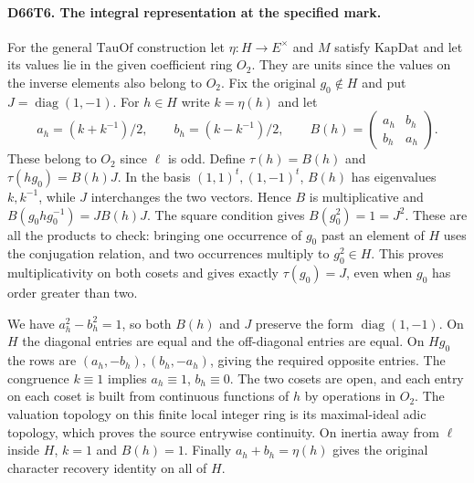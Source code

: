 \paragraph{D66T6. The integral representation at the specified mark.}
For the general $\mathrm{TauOf}$ construction let $\eta:H\to E^\times$
and $M$ satisfy $\mathrm{KapDat}$ and let its values lie in the
given coefficient ring $O_2$. They are units since the values on
the inverse elements also belong to $O_2$. Fix the original
$g_0\notin H$ and put $J=\operatorname{diag}(1,-1)$. For $h\in H$
write $k=\eta(h)$ and let
\[
 a_h=(k+k^{-1})/2,\qquad b_h=(k-k^{-1})/2,\qquad
 B(h)=\begin{pmatrix}a_h&b_h\\b_h&a_h\end{pmatrix}.
\]
These belong to $O_2$ since $\ell$ is odd. Define $\tau(h)=B(h)$
and $\tau(hg_0)=B(h)J$. In the basis $(1,1)^t,(1,-1)^t$,
$B(h)$ has eigenvalues $k,k^{-1}$, while $J$ interchanges the
two vectors. Hence $B$ is multiplicative and
$B(g_0 h g_0^{-1})=JB(h)J$. The square condition gives
$B(g_0^2)=1=J^2$. These are all the products to check: bringing
one occurrence of $g_0$ past an element of $H$ uses the conjugation
relation, and two occurrences multiply to $g_0^2\in H$.
This proves multiplicativity on both cosets and gives exactly
$\tau(g_0)=J$, even when $g_0$ has order greater than two.

We have $a_h^2-b_h^2=1$, so both $B(h)$ and $J$ preserve the
form $\operatorname{diag}(1,-1)$. On $H$ the diagonal entries are
equal and the off-diagonal entries are equal. On $Hg_0$ the rows
are $(a_h,-b_h),(b_h,-a_h)$, giving the required opposite entries.
The congruence $k\equiv1$ implies $a_h\equiv1$, $b_h\equiv0$.
The two cosets are open, and each entry on each coset is built from
continuous functions of $h$ by operations in $O_2$. The valuation
topology on this finite local integer ring is its maximal-ideal
adic topology, which proves the source entrywise continuity.
On inertia away from $\ell$ inside $H$, $k=1$ and $B(h)=1$.
Finally $a_h+b_h=\eta(h)$ gives the original character recovery
identity on all of $H$.

